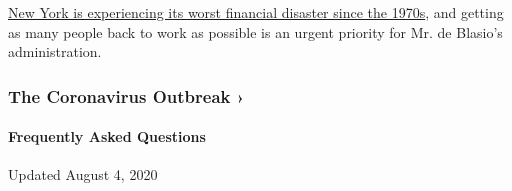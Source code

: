 \href{https://www.nytimes3xbfgragh.onion/2020/07/07/nyregion/nyc-unemployment.html}{New
York is experiencing its worst financial disaster since the 1970s}, and
getting as many people back to work as possible is an urgent priority
for Mr. de Blasio's administration.

\href{https://www.nytimes3xbfgragh.onion/news-event/coronavirus?action=click\&pgtype=Article\&state=default\&region=MAIN_CONTENT_3\&context=storylines_faq}{}

\hypertarget{the-coronavirus-outbreak-}{%
\subsubsection{The Coronavirus Outbreak
›}\label{the-coronavirus-outbreak-}}

\hypertarget{frequently-asked-questions}{%
\paragraph{Frequently Asked
Questions}\label{frequently-asked-questions}}

Updated August 4, 2020

